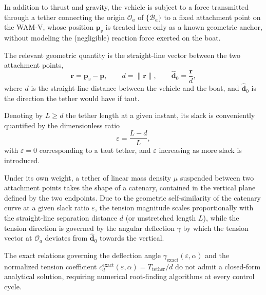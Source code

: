 In addition to thrust and gravity, the vehicle is subject to a force transmitted through a tether connecting the origin $\mathcal{O}_a$ of $\{\mathcal{B}_a\}$ to a fixed attachment point on the WAM-V, whose position $\mathbf{p}_v$ is treated here only as a known geometric anchor, without modeling the (negligible) reaction force exerted on the boat.

The relevant geometric quantity is the straight-line vector between the two attachment points,
\begin{equation}
    \mathbf{r} = \mathbf{p}_v - \mathbf{p}, \qquad d = \|\mathbf{r}\|, \qquad \hat{\mathbf{d}}_0 = \frac{\mathbf{r}}{d},
    \label{eq:uav_tether_geometry}
\end{equation}
where $d$ is the straight-line distance between the vehicle and the boat, and $\hat{\mathbf{d}}_0$ is the direction the tether would have if taut.

Denoting by $L \geq d$ the tether length at a given instant, its slack is conveniently quantified by the dimensionless ratio
\begin{equation}
    \varepsilon = \frac{L - d}{L},
    \label{eq:uav_tether_slack}
\end{equation}
with $\varepsilon = 0$ corresponding to a taut tether, and $\varepsilon$ increasing as more slack is introduced.

Under its own weight, a tether of linear mass density $\mu$ suspended between two attachment points takes the shape of a catenary, contained in the vertical plane defined by the two endpoints. Due to the geometric self-similarity of the catenary curve at a given slack ratio $\varepsilon$, the tension magnitude scales proportionally with the straight-line separation distance $d$ (or unstretched length $L$), while the tension direction is governed by the angular deflection $\gamma$ by which the tension vector at $\mathcal{O}_a$ deviates from $\hat{\mathbf{d}}_0$ towards the vertical.

The exact relations governing the deflection angle $\gamma_{\mathrm{exact}}(\varepsilon,\alpha)$ and the normalized tension coefficient $c_d^{\mathrm{exact}}(\varepsilon,\alpha) = T_{\mathrm{tether}}/d$ do not admit a closed-form analytical solution, requiring numerical root-finding algorithms at every control cycle.

